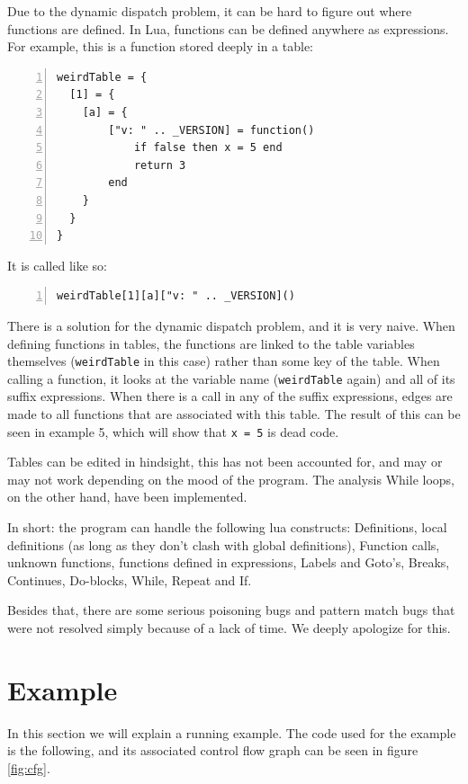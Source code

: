 \documentclass[10pt]{article}
\begin{document}
Due to the dynamic dispatch problem, it can be hard to figure out where functions are defined. In Lua, functions can be defined anywhere as expressions. For example, this is a function stored deeply in a table:
\begin{lstlisting}[frame=single,numbers=left,caption=Running with an example file]
weirdTable = {
  [1] = {
    [a] = {
        ["v: " .. _VERSION] = function()
            if false then x = 5 end
            return 3
        end
    }
  }
}
\end{lstlisting}
It is called like so:
\begin{lstlisting}[frame=single,numbers=left,caption=Running with an example file]
weirdTable[1][a]["v: " .. _VERSION]()
\end{lstlisting}

There is a solution for the dynamic dispatch problem, and it is very naive. When defining functions in tables, the functions are linked to the table variables themselves (\texttt{weirdTable} in this case) rather than some key of the table. When calling a function, it looks at the variable name (\texttt{weirdTable} again) and all of its suffix expressions. When there is a call in any of the suffix expressions, edges are made to all functions that are associated with this table. The result of this can be seen in example 5, which will show that \texttt{x = 5} is dead code.

Tables can be edited in hindsight, this has not been accounted for, and may or may not work depending on the mood of the program. The analysis While loops, on the other hand, have been implemented.

In short: the program can handle the following lua constructs: Definitions, local definitions (as long as they don't clash with global definitions), Function calls, unknown functions, functions defined in expressions, Labels and Goto's, Breaks, Continues, Do-blocks, While, Repeat and If.

Besides that, there are some serious poisoning bugs and pattern match bugs that were not resolved simply because of a lack of time. We deeply apologize for this.


\section{Example}
In this section we will explain a running example. The code used for the example is the following, and its associated control flow graph can be seen in figure \ref{fig:cfg}.\\
\end{document}
